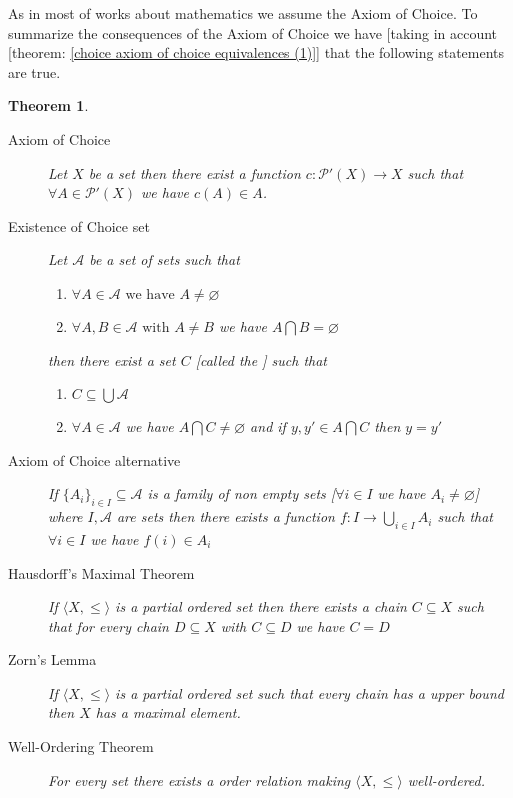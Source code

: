 \documentclass{book}
\newcommand{\tmdummy}{$\mbox{}$}
\newcommand{\tmtextbf}[1]{\text{{\bfseries{#1}}}}
\newenvironment{enumeratealpha}{\begin{enumerate}[a{\textup{)}}] }{\end{enumerate}}
\newtheorem{theorem}{Theorem}
\begin{document}
As in most of works about mathematics we assume the Axiom of Choice. To
summarize the consequences of the Axiom of Choice we have [taking in account
[theorem: \ref{choice axiom of choice equivalences (1)}] that the following
statements are true.

\begin{theorem}
  \label{choice Axiom of choice consequences}{\tmdummy}
  
  \begin{description}
    \item[Axiom of Choice] Let $X$ be a set then there exist a function $c :
    \mathcal{P}' (X) \rightarrow X$ such that $\forall A \in \mathcal{P}' (X)$
    we have $c (A) \in A$.
    
    \item[Existence of Choice set] Let $\mathcal{A}$ be a set of sets such
    that
    \begin{enumeratealpha}
      \item $\forall A \in \mathcal{A} \text{ we have } A \neq \varnothing$
      
      \item $\forall A, B \in \mathcal{A} \text{ with } A \neq B$ we have $A
      \bigcap B = \varnothing$
    \end{enumeratealpha}
    then there exist a set $C$ [called the \tmtextbf{choice set of
    $\mathcal{A}$}] such that
    \begin{enumeratealpha}
      \item $C \subseteq \bigcup \mathcal{A}$
      
      \item $\forall A \in \mathcal{A}$ we have $A \bigcap C \neq \varnothing$
      and if $y, y' \in A \bigcap C$ then $y = y'$
    \end{enumeratealpha}
    \item[Axiom of Choice alternative] If $\{ A_i \}_{i \in I} \subseteq
    \mathcal{A}$ is a family of non empty sets [$\forall i \in I$ we have $A_i
    \neq \varnothing$] where $I, \mathcal{A}$ are sets then there exists a
    function $f : I \rightarrow \bigcup_{i \in I} A_i$ such that $\forall i
    \in I$ we have $f (i) \in A_i$
    
    \item[Hausdorff's Maximal Theorem] If $\langle X, \leqslant \rangle$ is a
    partial ordered set then there exists a chain $C \subseteq X$ such that
    for every chain $D \subseteq X$ with $C \subseteq D$ we have $C = D$
    
    \item[Zorn's Lemma] If $\langle X, \leqslant \rangle$ is a partial ordered
    set such that every chain has a upper bound then $X$ has a maximal
    element.
    
    \item[Well-Ordering Theorem] For every set there exists a order relation
    making $\langle X, \leqslant \rangle$ well-ordered.
  \end{description}
\end{theorem}
\end{document}
